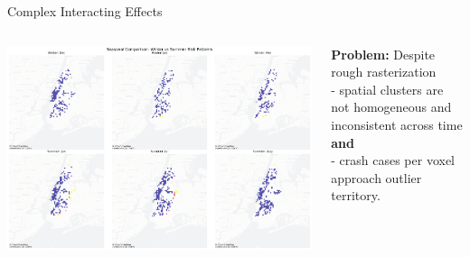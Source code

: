 \documentclass[aspectratio=169,xcolor={usenames,dvipsnames,svgnames,table},10pt,usepdftitle=false,hyperref={bookmarksdepth=3}]{beamer}
\makeatletter
\renewenvironment{figure}[1][]{%
  \def\@captype{figure}%
  \par\centering}
  {\par}
\makeatother
\begin{document}

\begin{frame}{Complex Interacting Effects}
    \vspace{0.2cm}
    \begin{columns}
        \begin{column}{0.6\textwidth}
            \begin{figure}
                \centering
                \includegraphics[width=\textwidth]{../results/cellx800m_celly800m_cellt6h/plots/seasonal_risk_comparison_800.0m_800.0m_6.0h.png}
                \caption{Seasonal risk patterns differ spatially}
            \end{figure}
        \end{column}

        \begin{column}{0.4\textwidth}
            \textbf{Problem:} Despite rough rasterization \\
            - spatial clusters are not homogeneous and inconsistent across time \textbf{and} \\
            - crash cases per voxel approach outlier territory.
        \end{column}
    \end{columns}
\end{frame}
\end{document}
